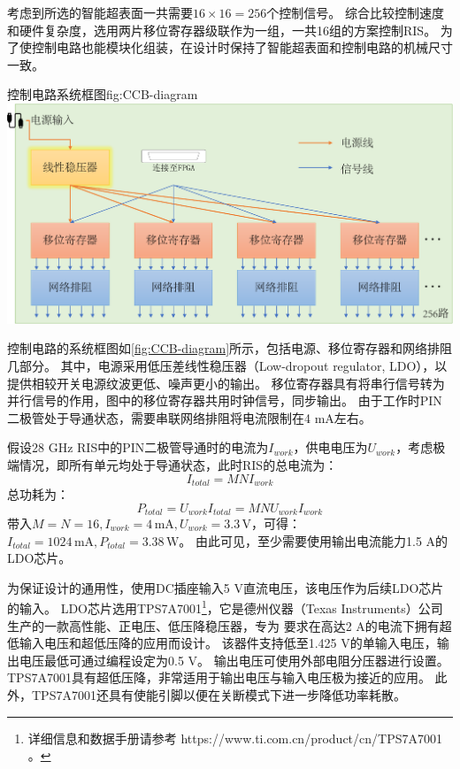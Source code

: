 \documentclass[supercite]{HustGraduPaper}
\begin{document}

考虑到所选的智能超表面一共需要$16\times16=256$个控制信号。
综合比较控制速度和硬件复杂度，选用两片移位寄存器级联作为一组，一共16组的方案控制RIS。
为了使控制电路也能模块化组装，在设计时保持了智能超表面和控制电路的机械尺寸一致。

\begin{generalfig}[htb]{控制电路系统框图}{fig:CCB-diagram}
	\includegraphics[width=0.8\linewidth]{Figures/CCB-diagram.pdf}
\end{generalfig}

控制电路的系统框图如\autoref{fig:CCB-diagram}所示，包括电源、移位寄存器和网络排阻几部分。
其中，电源采用低压差线性稳压器（Low-dropout regulator, LDO），以提供相较开关电源纹波更低、噪声更小的输出。
移位寄存器具有将串行信号转为并行信号的作用，图中的移位寄存器共用时钟信号，同步输出。
由于工作时PIN二极管处于导通状态，需要串联网络排阻将电流限制在4 mA左右。


假设28 GHz RIS中的PIN二极管导通时的电流为$I_{work}$，供电电压为$U_{work}$，考虑极端情况，即所有单元均处于导通状态，此时RIS的总电流为：
\begin{equation}
	I_{total}=MNI_{work}
\end{equation}
总功耗为：
\begin{equation}
	P_{total}=U_{work}I_{total}=MNU_{work}I_{work}
\end{equation}
带入$M=N=16,I_{work}=4\,\mathrm{mA}, U_{work}=3.3\, \mathrm{V}$，可得：$I_{total}=1024 \, \mathrm{mA},P_{total}=3.38\,\mathrm{W}$。
由此可见，至少需要使用输出电流能力1.5 A的LDO芯片。

为保证设计的通用性，使用DC插座输入5 V直流电压，该电压作为后续LDO芯片的输入。
LDO芯片选用TPS7A7001\footnote{详细信息和数据手册请参考 https://www.ti.com.cn/product/cn/TPS7A7001 。}，它是德州仪器（Texas Instruments）公司生产的一款高性能、正电压、低压降稳压器，专为 要求在高达2 A的电流下拥有超低输入电压和超低压降的应用而设计。
该器件支持低至1.425 V的单输入电压，输出电压最低可通过编程设定为0.5 V。
输出电压可使用外部电阻分压器进行设置。TPS7A7001具有超低压降，非常适用于输出电压与输入电压极为接近的应用。
此外，TPS7A7001还具有使能引脚以便在关断模式下进一步降低功率耗散。
\end{document}

